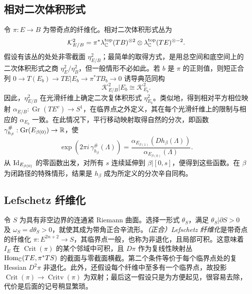 \subsection{相对二次体积形式}\label{sec:15c}
令 $\pi:E\to B$ 为带奇点的纤维化。相对二次体积形式丛为
\[
\mathcal K_{E/B}^2=\pi^*\lambda_{\mathbb C}^{\mathrm{top}}(TB)^{\otimes2}\otimes
\lambda_{\mathbb C}^{\mathrm{top}}(TE)^{\otimes-2}.
\]
假设有该丛的处处非零截面 $\eta_{E/B}^2$；最简单的取得方式，是用总空间和底空间上的二次体积形式之商 $\eta_E^2/\eta_B^2$，但一般情形不必如此。若 $b$ 是 $\pi$ 的正则值，则短正合列 $0\to T(E_b)\to TE|E_b\to\pi^*TB_b\to0$ 诱导典范同构
\[
\mathcal K_{E/B}^2|E_b\cong\mathcal K_{E_b}^2.
\]
因此，$\eta_{E/B}^2$ 在光滑纤维上确定二次复体积形式 $\eta_{E_b}^2$。类似地，得到相对平方相位映射 $\alpha_{E/B}:\operatorname{Gr}(TE^v)\to S^1$，在临界点之外定义，其在每个光滑纤维上的限制与相应的 $\alpha_{E_b}$ 一致。在此情况下，平行移动映射取得自然的分次，即函数 $\gamma_{h_\beta}^\#:\operatorname{Gr}(E_{\beta(0)})\to\mathbb R$，使
\begin{equation}\label{eq:15.8}
\exp(2\pi i\,\gamma_{h_\beta}^\#(\Lambda))
=\frac{\alpha_{E_{\beta(1)}}(Dh_\beta(\Lambda))}{\alpha_{E_{\beta(0)}}(\Lambda)}.
\end{equation}
从 $\operatorname{Id}_{E_{\beta(0)}}$ 的零函数出发，对所有 $s$ 连续延伸到 $\beta|[0,s]$，便得到这些函数。在 $\beta$ 为闭路径的特殊情形，结果是 $h_\beta$ 成为所定义的分次辛自同构。

\subsection{Lefschetz 纤维化}\label{sec:15d}
令 $S$ 为具有非空边界的连通紧 Riemann 曲面。选择一形式 $\theta_S$，满足 $\theta_S|\partial S>0$ 及 $\omega_S=d\theta_S>0$，就使其成为带角正合辛流形。\emph{（正合）Lefschetz 纤维化}是带奇点的纤维化 $\pi:E^{2n+2}\to S$，其临界点一般，也称为非退化，且局部可积。这意味着 $I_E$ 在 $\operatorname{Crit}(\pi)$ 的某个邻域中可积，且 $D\pi$ 作为复线性映射丛 $\operatorname{Hom}_{\mathbb C}(TE,\pi^*TS)$ 的截面与零截面横截。第二个条件等价于每个临界点处的复 Hessian $D^2\pi$ 非退化。此外，还假设每个纤维中至多有一个临界点，故投影 $\operatorname{Crit}(\pi)\to\operatorname{Critv}(\pi)$ 为双射；最后这一假设只是为方便起见，很容易去除，代价是后面的记号稍显繁琐。

